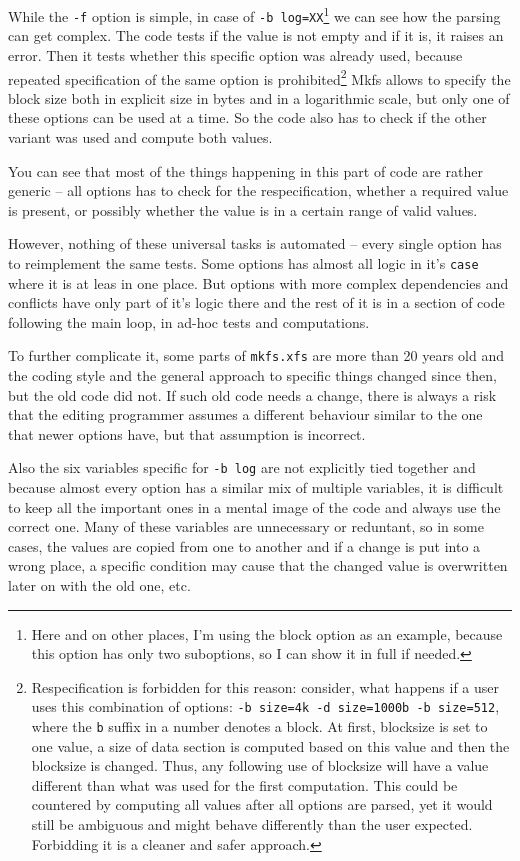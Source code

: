 While the {\tt -f} option is simple, in case of {\tt -b
log=XX}\footnote{Here and on other places, I'm using the block option as an
example, because this option has only two suboptions, so I can show it in
full if needed.} we can see how the parsing can get complex. The code tests
if the value is not empty and if it is, it raises an error. Then it tests
whether this specific option was already used, because repeated
specification of the same option is prohibited\footnote{Respecification is
	forbidden for this reason: consider, what happens if a user uses
	this combination of options: {\tt  -b size=4k -d size=1000b -b
	size=512}, where the {\tt b} suffix in a number denotes a block. At
	first, blocksize is set to one value, a size of data section is
	computed based on this value and then the blocksize is changed.
	Thus, any following use of blocksize will have a value different
	than what was used for the first computation. This could be
	countered by computing all values after all options are parsed, yet
	it would still be ambiguous and might behave differently than the
	user expected. Forbidding it is a cleaner and safer approach.} Mkfs
	allows to specify the block size both in explicit size in bytes and
	in a logarithmic scale, but only one of these options can be used
	at a time. So the code also has to check if the other variant was
	used and compute both values.

You can see that most of the things happening in this part of code are
rather generic -- all options has to check for the respecification, whether
a required value is present, or possibly whether the value is in a certain
range of valid values.

However, nothing of these universal tasks is automated -- every single
option has to reimplement the same tests. Some options has almost all logic
in it's {\tt case} where it is at leas in one place. But options with more
complex dependencies and conflicts have only part of it's logic there and
the rest of it is in a section of code following the main loop, in ad-hoc
tests and computations.

To further complicate it, some parts of {\tt mkfs.xfs} are more than 20
years old and the coding style and the general approach to specific things
changed since then, but the old code did not. If such old code needs a
change, there is always a risk that the editing programmer assumes a
different behaviour similar to the one that newer options have, but that
assumption is incorrect.

Also the six variables specific for {\tt -b log} are not explicitly tied
together and because almost every option has a similar mix of multiple
variables, it is difficult to keep all the important ones in a mental image
of the code and always use the correct one. Many of these variables are
unnecessary or reduntant, so in some cases, the values are copied from one
to another and if a change is put into a wrong place, a specific condition
may cause that the changed value is overwritten later on with the old one,
etc.


